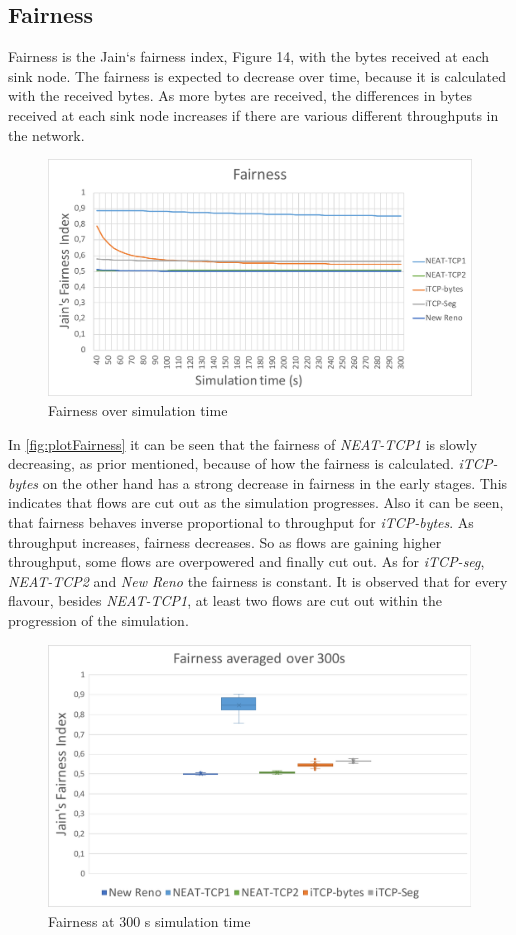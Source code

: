 \subsection{Fairness}\label{subsec:fairness}
Fairness is the Jain`s fairness index, Figure 14, with the bytes received at each sink node. 
The fairness is expected to decrease over time, because it is calculated with the received bytes.
 As more bytes are received, the differences in bytes received at each sink node increases if there are various different throughputs in the network.
\begin{figure}[h]
	\centering
	\includegraphics[width=1\textwidth]{plotFairness}
	\caption{Fairness over simulation time}
	\label{fig:plotFairness}
\end{figure}
In \autoref{fig:plotFairness} it can be seen that the fairness of \textit{NEAT-TCP1} is slowly decreasing, as prior mentioned, because of how the fairness is calculated.
\textit{iTCP-bytes} on the other hand has a strong decrease in fairness in the early stages. This indicates that flows are cut out as the simulation progresses. Also it can be seen, that fairness behaves inverse proportional to throughput for \textit{iTCP-bytes}. As throughput increases, fairness decreases. So as flows are gaining higher throughput, some flows are overpowered and finally cut out. 
As for \textit{iTCP-seg}, \textit{NEAT-TCP2} and \textit{New Reno} the fairness is constant. It is observed that for every flavour, besides \textit{NEAT-TCP1}, at least two flows are cut out within the progression of the simulation.
\begin{figure}[h]
	\centering
	\includegraphics[width=1\textwidth]{boxFairness}
	\caption{Fairness at 300 s simulation time}
	\label{fig:boxFairness}
\end{figure}
